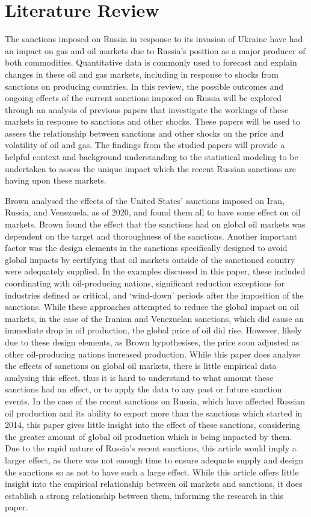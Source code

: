 \section{Literature Review}
The sanctions imposed on Russia in response to its invasion of Ukraine have had an impact on gas and oil markets due to Russia’s position as a major producer of both commodities. Quantitative data is commonly used to forecast and explain changes in these oil and gas markets, including in response to shocks from sanctions on producing countries. In this review, the possible outcomes and ongoing effects of the current sanctions imposed on Russia will be explored through an analysis of previous papers that investigate the workings of these markets in response to sanctions and other shocks. These papers will be used to assess the relationship between sanctions and other shocks on the price and volatility of oil and gas. The findings from the studied papers will provide a helpful context and background understanding to the statistical modeling to be undertaken to assess the unique impact which the recent Russian sanctions are having upon these markets.
\medskip

Brown \cite{aid1} analysed the effects of the United States’ sanctions imposed on Iran, Russia, and Venezuela, as of 2020, and found them all to have some effect on oil markets. Brown found the effect that the sanctions had on global oil markets was dependent on the target and thoroughness of the sanctions. Another important factor was the design elements in the sanctions specifically designed to avoid global impacts by certifying that oil markets outside of the sanctioned country were adequately supplied. In the examples discussed in this paper, these included coordinating with oil-producing nations, significant reduction exceptions for industries defined as critical, and ‘wind-down’ periods after the imposition of the sanctions. While these approaches attempted to reduce the global impact on oil markets, in the case of the Iranian and Venezuelan sanctions, which did cause an immediate drop in oil production, the global price of oil did rise. However, likely due to these design elements, as Brown hypothesises, the price soon adjusted as other oil-producing nations increased production. While this paper does analyse the effects of sanctions on global oil markets, there is little empirical data analysing this effect, thus it is hard to understand to what amount these sanctions had an effect, or to apply the data to any past or future sanction events. In the case of the recent sanctions on Russia, which have affected Russian oil production and its ability to export more than the sanctions which started in 2014, this paper gives little insight into the effect of these sanctions, considering the greater amount of global oil production which is being impacted by them. Due to the rapid nature of Russia’s recent sanctions, this article would imply a larger effect, as there was not enough time to ensure adequate supply and design the sanctions so as not to have such a large effect. While this article offers little insight into the empirical relationship between oil markets and sanctions, it does establish a strong relationship between them, informing the research in this paper.
\medskip

